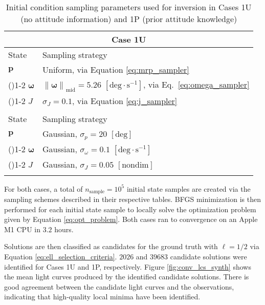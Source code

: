 \documentclass[a4paper,twocolumn]{spaceDebrisC} %
\newcommand{\grule}[0]{\arrayrulecolor{darkgray}\cmidrule(){1-2}}
\newcommand{\brule}[0]{\arrayrulecolor{black} \bottomrule}
\newcommand{\vctr}[1]{\bm{#1}}
\newcommand{\norm}[1]{\left\lVert#1\right\rVert}
\begin{document}
\begin{table}[H]
  \centering
  \renewcommand{\arraystretch}{1.2} 
  \caption{Initial condition sampling parameters used for inversion in Cases 1U (no attitude information) and 1P (prior attitude knowledge)}
  \vspace*{6pt}
  \begin{tabular}{@{} l l @{}}
    \toprule
    \multicolumn{2}{c}{\textbf{Case 1U}} \\
    \midrule
 State & Sampling strategy \\ \midrule
    $\vctr{p}$ & Uniform, via Equation \ref{eq:mrp_sampler} \\ \grule
    $\vctr{\omega}$ & $\norm{\vctr{\omega}}_\text{mid} = 5.26$ $[\text{deg}\cdot \text{s}^{-1}]$, via Eq.\ \ref{eq:omega_sampler} \\ \grule
    $J$ &  $\sigma_J = 0.1$, via Equation \ref{eq:j_sampler} \\ \brule
    \addlinespace
    \toprule
    \multicolumn{2}{c}{\textbf{Case 1P}} \\
    \midrule
 State & Sampling strategy \\ \midrule
    $\vctr{p}$ & Gaussian, $\sigma_p=20$ $[\text{deg}]$ \\ \grule
    $\vctr{\omega}$ & Gaussian, $\sigma_\omega = 0.1$ $[\text{deg}\cdot\text{s}^{-1}]$ \\ \grule
    $J$ & Gaussian, $\sigma_J = 0.05$ $[\text{nondim}]$ \\ \brule
  \end{tabular}
  \label{tb:case1Ub_priors}
\end{table}

For both cases, a total of $n_\text{sample}=10^5$ initial state samples are created via the sampling schemes described in their respective tables. BFGS minimization is then performed for each initial state sample to locally solve the optimization problem given by Equation \ref{eq:opt_problem}. Both cases ran to convergence on an Apple M1 CPU in $3.2$ hours.

Solutions are then classified as candidates for the ground truth with $\ell = 1/2$ via Equation \ref{eq:ell_selection_criteria}. $2026$ and $39683$ candidate solutions were identified for Cases 1U and 1P, respectively. Figure \ref{fig:conv_lcs_synth} shows the mean light curves produced by the identified candidate solutions. There is good agreement between the candidate light curves and the observations, indicating that high-quality local minima have been identified.
\end{document}
